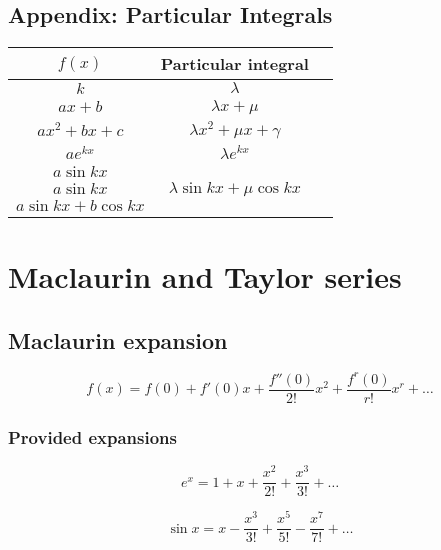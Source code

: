 \documentclass[a4paper,9pt]{scrartcl}
\begin{document}
    \subsection{Appendix: Particular Integrals}
    \begin{tabular}{|c|c|c|}
        \hline $f(x)$         & Particular integral                                  \\
        \hline $k$            & $\lambda$                                            \\
        \hline $ax+b$         & ${\lambda}x+\mu$                                     \\
        \hline $ax^2+bx+c$    & ${\lambda}x^2+{\mu}x+\gamma$                         \\
        \hline $ae^{kx}$      & ${\lambda}e^{kx}$                                    \\
        \hline $a\sin{kx}$    & \multirow{3}{*}{${\lambda}\sin{kx}+{\mu}{\cos{kx}}$} \\
        $a\sin{kx}$           &                                                      \\
        $a\sin{kx}+b\cos{kx}$ &                                                      \\
        \hline
    \end{tabular}


    \section{Maclaurin and Taylor series}

    \subsection{Maclaurin expansion}

    \begin{displaymath}
        f(x) = f(0) + f'(0)x + \frac{f''(0)}{2!}x^2 + \frac{f^{r}(0)}{r!}x^r + \dots
    \end{displaymath}

    \subsubsection{Provided expansions}
    \begin{displaymath}
        e^x = 1 + x + \frac{x^2}{2!} + \frac{x^3}{3!} + \dots
    \end{displaymath}

    \begin{displaymath}
        \sin{x} = x - \frac{x^3}{3!} + \frac{x^5}{5!} - \frac{x^7}{7!} + \dots
    \end{displaymath}
\end{document}
